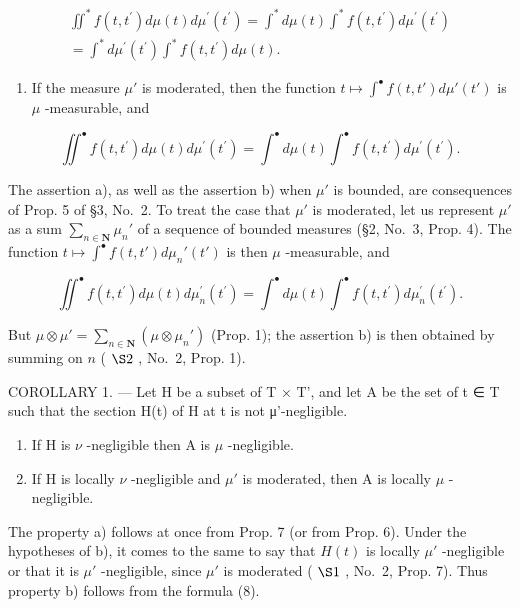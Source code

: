 \[
\begin{array}{r} \iint^ {*} f (t, t ^ {\prime}) d \mu (t) d \mu^ {\prime} (t ^ {\prime}) = \int^ {*} d \mu (t) \int^ {*} f (t, t ^ {\prime}) d \mu^ {\prime} (t ^ {\prime}) \\ = \int^ {*} d \mu^ {\prime} (t ^ {\prime}) \int^ {*} f (t, t ^ {\prime}) d \mu (t). \end{array}\tag{7}
\]

\begin{enumerate}
\def\labelenumi{\alph{enumi})}
\setcounter{enumi}{1}
\tightlist
\item
  If the measure \(\mu'\) is moderated, then the function \(t \mapsto \int^{\bullet} f(t, t') d\mu'(t')\) is \(\mu\) -measurable, and
\end{enumerate}

\[
\iint^ {\bullet} f (t, t ^ {\prime}) d \mu (t) d \mu^ {\prime} (t ^ {\prime}) = \int^ {\bullet} d \mu (t) \int^ {\bullet} f (t, t ^ {\prime}) d \mu^ {\prime} (t ^ {\prime}).\tag{8}
\]

The assertion a), as well as the assertion b) when \(\mu'\) is bounded, are consequences of Prop. 5 of §3, No.~2. To treat the case that \(\mu'\) is moderated, let us represent \(\mu'\) as a sum \(\sum_{n\in\mathbf{N}}\mu_n'\) of a sequence of bounded measures (§2, No.~3, Prop. 4). The function \(t\mapsto\int^{\bullet}f(t,t')d\mu_n'(t')\) is then \(\mu\) -measurable, and

\[
\iint^ {\bullet} f (t, t ^ {\prime}) d \mu (t) d \mu_ {n} ^ {\prime} (t ^ {\prime}) = \int^ {\bullet} d \mu (t) \int^ {\bullet} f (t, t ^ {\prime}) d \mu_ {n} ^ {\prime} (t ^ {\prime}).
\]

But \(\mu \otimes \mu' = \sum_{n \in \mathbf{N}} (\mu \otimes \mu_n')\) (Prop. 1); the assertion b) is then obtained by summing on \(n\) ( \(\S 2\) , No.~2, Prop. 1).

COROLLARY 1. --- Let H be a subset of T × T', and let A be the set of t ∈ T such that the section H(t) of H at t is not μ'-negligible.

\begin{enumerate}
\def\labelenumi{\alph{enumi})}
\item
  If H is \(\nu\) -negligible then A is \(\mu\) -negligible.
\item
  If H is locally \(\nu\) -negligible and \(\mu'\) is moderated, then A is locally \(\mu\) -negligible.
\end{enumerate}

The property a) follows at once from Prop. 7 (or from Prop. 6). Under the hypotheses of b), it comes to the same to say that \(H(t)\) is locally \(\mu'\) -negligible or that it is \(\mu'\) -negligible, since \(\mu'\) is moderated ( \(\S1\) , No.~2, Prop. 7). Thus property b) follows from the formula (8).

